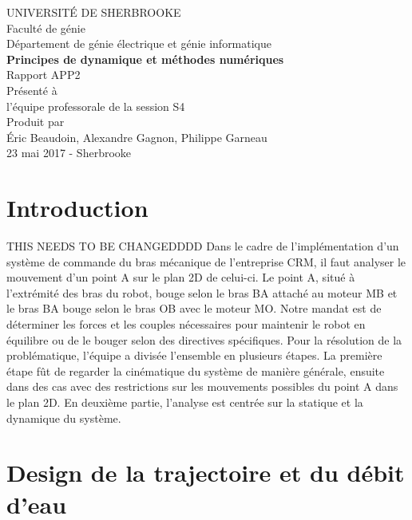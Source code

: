 \documentclass{article}
\begin{document}
\begin{titlepage}   
	\large{
		\begin{center}
			UNIVERSITÉ DE SHERBROOKE\\Faculté de génie\\
			Département de génie électrique et génie informatique\\
			\vspace{3cm}
			{\LARGE\textbf{Principes de dynamique et méthodes numériques}}\\
			\vspace{2cm}
			\LARGE{Rapport APP2}\\
			\vspace{2cm}
			Présenté à\\l'équipe professorale de la session S4\\
			\vspace{2cm}
			Produit par\\Éric Beaudoin, Alexandre Gagnon, Philippe Garneau\\
			\vspace{1cm}
			\vfill{23 mai 2017 - Sherbrooke}
		\end{center}
	}
\end{titlepage}
\newpage
\tableofcontents

\newpage
\section{Introduction}
THIS NEEDS TO BE CHANGEDDDD
Dans le cadre de l'implémentation d'un système de commande du bras mécanique de l'entreprise CRM, il faut analyser le mouvement d'un point A sur le plan 2D de celui-ci. Le point A, situé à l'extrémité des bras du robot, bouge selon le bras BA attaché au moteur MB et le bras BA bouge selon le bras OB avec le moteur MO. Notre mandat est de déterminer les forces et les couples nécessaires pour maintenir le robot en équilibre ou de le bouger selon des directives spécifiques. Pour la résolution de la problématique, l'équipe a divisée l'ensemble en plusieurs étapes. La première étape fût de regarder la cinématique du système de manière générale, ensuite dans des cas avec des restrictions sur les mouvements possibles du point A dans le plan 2D. En deuxième partie, l'analyse est centrée sur la statique et la dynamique du système. 

\section{Design de la trajectoire et du débit d'eau}
\end{document}
